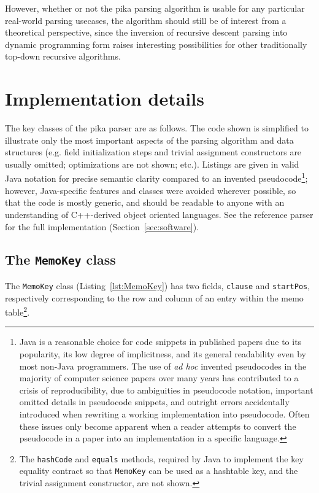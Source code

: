 \documentclass[manuscript,screen]{acmart}
\begin{document}
However, whether or not the pika parsing algorithm is usable for any particular real-world parsing usecases, the algorithm should still be of interest from a theoretical perspective, since the inversion of recursive descent parsing into dynamic programming form raises interesting possibilities for other traditionally top-down recursive algorithms.

\section{Implementation details}

The key classes of the pika parser are as follows. The code shown is simplified to illustrate only the most important aspects of the parsing algorithm and data structures (e.g. field initialization steps and trivial assignment constructors are usually omitted; optimizations are not shown; etc.). Listings are given in valid Java notation for precise semantic clarity compared to an invented pseudocode\footnote{Java is a reasonable choice for code snippets in published papers due to its popularity, its low degree of implicitness, and its general readability even by most non-Java programmers. The use of \emph{ad hoc} invented pseudocodes in the majority of computer science papers over many years has contributed to a crisis of reproducibility, due to ambiguities in pseudocode notation, important omitted details in pseudocode snippets, and outright errors accidentally introduced when rewriting a working implementation into pseudocode. Often these issues only become apparent when a reader attempts to convert the pseudocode in a paper into an implementation in a specific language.}; however, Java-specific features and classes were avoided wherever possible, so that the code is mostly generic, and should be readable to anyone with an understanding of C++-derived object oriented languages. See the reference parser for the full implementation (Section~\ref{sec:software}).

\subsection{\label{sec:MemoKey}The \texttt{MemoKey} class}

The \texttt{MemoKey} class (Listing~\ref{lst:MemoKey}) has two fields, \texttt{clause} and \texttt{startPos}, respectively corresponding to the row and column of an entry within the memo table\footnote{The \texttt{hashCode} and \texttt{equals} methods, required by Java to implement the key equality contract so that \texttt{MemoKey} can be used as a hashtable key, and the trivial assignment constructor, are not shown.}.
\end{document}
